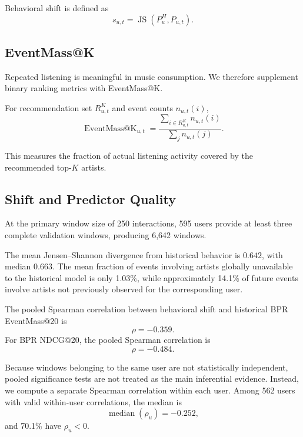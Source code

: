 \documentclass[11pt]{article}
\begin{document}
Behavioral shift is defined as
%
\begin{equation}
    s_{u,t}
    =
    \operatorname{JS}
    \left(
        P_u^{H},
        P_{u,t}
    \right).
\end{equation}

\subsection{EventMass@K}

Repeated listening is meaningful in music consumption. We therefore
supplement binary ranking metrics with EventMass@K.

For recommendation set $R_{u,t}^{K}$ and event counts
$n_{u,t}(i)$,
%
\begin{equation}
    \operatorname{EventMass@K}_{u,t}
    =
    \frac{
        \sum_{i\in R_{u,t}^{K}}
        n_{u,t}(i)
    }{
        \sum_j n_{u,t}(j)
    }.
\end{equation}

This measures the fraction of actual listening activity covered by the
recommended top-$K$ artists.

\subsection{Shift and Predictor Quality}

At the primary window size of 250 interactions, 595 users provide at
least three complete validation windows, producing 6,642 windows.

The mean Jensen--Shannon divergence from historical behavior is
$0.642$, with median $0.663$. The mean fraction of events involving
artists globally unavailable to the historical model is only 1.03\%,
while approximately 14.1\% of future events involve artists not
previously observed for the corresponding user.

The pooled Spearman correlation between behavioral shift and historical
BPR EventMass@20 is
%
\begin{equation}
    \rho = -0.359.
\end{equation}
%
For BPR NDCG@20, the pooled Spearman correlation is
%
\begin{equation}
    \rho = -0.484.
\end{equation}

Because windows belonging to the same user are not statistically
independent, pooled significance tests are not treated as the main
inferential evidence. Instead, we compute a separate Spearman
correlation within each user. Among 562 users with valid within-user
correlations, the median is
%
\begin{equation}
    \operatorname{median}(\rho_u)
    =
    -0.252,
\end{equation}
%
and 70.1\% have $\rho_u<0$.
\end{document}

